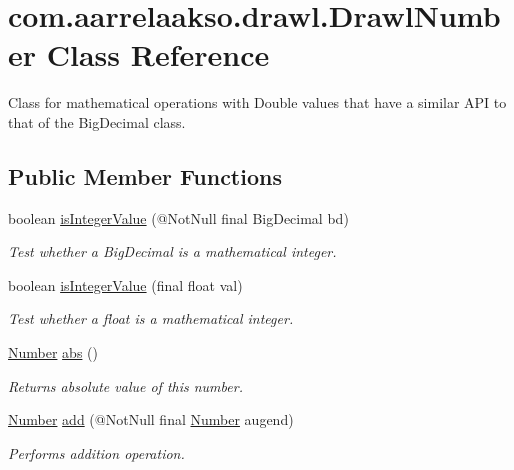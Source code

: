 \hypertarget{classcom_1_1aarrelaakso_1_1drawl_1_1_drawl_number}{}\section{com.\+aarrelaakso.\+drawl.\+Drawl\+Number Class Reference}
\label{classcom_1_1aarrelaakso_1_1drawl_1_1_drawl_number}


Class for mathematical operations with Double values that have a similar A\+PI to that of the Big\+Decimal class.  


\subsection*{Public Member Functions}
\begin{DoxyCompactItemize}
\item 
boolean \hyperlink{classcom_1_1aarrelaakso_1_1drawl_1_1_drawl_number_aae7f631882c9400f8fcc7d5c04441d2b}{is\+Integer\+Value} (@Not\+Null final Big\+Decimal bd)
\begin{DoxyCompactList}\small\item\em Test whether a Big\+Decimal is a mathematical integer. \end{DoxyCompactList}\item 
boolean \hyperlink{classcom_1_1aarrelaakso_1_1drawl_1_1_drawl_number_a6400df8bf99b502371a39347f8d7dff2}{is\+Integer\+Value} (final float val)
\begin{DoxyCompactList}\small\item\em Test whether a float is a mathematical integer. \end{DoxyCompactList}\item 
\hyperlink{interfacecom_1_1aarrelaakso_1_1drawl_1_1_number}{Number} \hyperlink{classcom_1_1aarrelaakso_1_1drawl_1_1_drawl_number_a2bdcf6f7da129ae45c46f7e91bc65636}{abs} ()
\begin{DoxyCompactList}\small\item\em Returns absolute value of this number. \end{DoxyCompactList}\item 
\hyperlink{interfacecom_1_1aarrelaakso_1_1drawl_1_1_number}{Number} \hyperlink{classcom_1_1aarrelaakso_1_1drawl_1_1_drawl_number_a484120b1cacb13f1266bf1d3f002ce3d}{add} (@Not\+Null final \hyperlink{interfacecom_1_1aarrelaakso_1_1drawl_1_1_number}{Number} augend)
\begin{DoxyCompactList}\small\item\em Performs addition operation. \end{DoxyCompactList}\item 

\end{DoxyCompactItemize}
